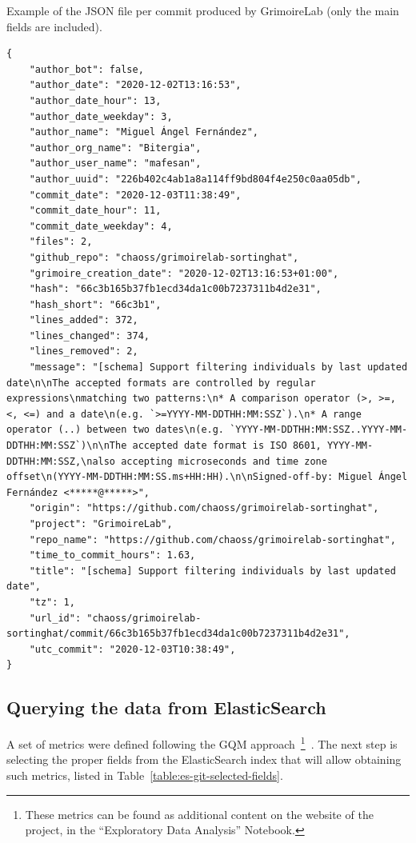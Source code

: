 \documentclass[a4paper, 12pt]{book}
\begin{document}
\begin{listing}[h!]
    \caption{Example of the JSON file per commit produced by GrimoireLab (only the main fields are included).}{}
    \label{lst:git-elasticsearch}
    \begin{verbatim}
{
    "author_bot": false,
    "author_date": "2020-12-02T13:16:53",
    "author_date_hour": 13,
    "author_date_weekday": 3,
    "author_name": "Miguel Ángel Fernández",
    "author_org_name": "Bitergia",
    "author_user_name": "mafesan",
    "author_uuid": "226b402c4ab1a8a114ff9bd804f4e250c0aa05db",
    "commit_date": "2020-12-03T11:38:49",
    "commit_date_hour": 11,
    "commit_date_weekday": 4,
    "files": 2,
    "github_repo": "chaoss/grimoirelab-sortinghat",
    "grimoire_creation_date": "2020-12-02T13:16:53+01:00",
    "hash": "66c3b165b37fb1ecd34da1c00b7237311b4d2e31",
    "hash_short": "66c3b1",
    "lines_added": 372,
    "lines_changed": 374,
    "lines_removed": 2,
    "message": "[schema] Support filtering individuals by last updated date\n\nThe accepted formats are controlled by regular expressions\nmatching two patterns:\n* A comparison operator (>, >=, <, <=) and a date\n(e.g. `>=YYYY-MM-DDTHH:MM:SSZ`).\n* A range operator (..) between two dates\n(e.g. `YYYY-MM-DDTHH:MM:SSZ..YYYY-MM-DDTHH:MM:SSZ`)\n\nThe accepted date format is ISO 8601, YYYY-MM-DDTHH:MM:SSZ,\nalso accepting microseconds and time zone offset\n(YYYY-MM-DDTHH:MM:SS.ms+HH:HH).\n\nSigned-off-by: Miguel Ángel Fernández <*****@*****>",
    "origin": "https://github.com/chaoss/grimoirelab-sortinghat",
    "project": "GrimoireLab",
    "repo_name": "https://github.com/chaoss/grimoirelab-sortinghat",
    "time_to_commit_hours": 1.63,
    "title": "[schema] Support filtering individuals by last updated date",
    "tz": 1,
    "url_id": "chaoss/grimoirelab-sortinghat/commit/66c3b165b37fb1ecd34da1c00b7237311b4d2e31",
    "utc_commit": "2020-12-03T10:38:49",
}
    \end{verbatim}
\end{listing}

\subsection{Querying the data from ElasticSearch}
\label{ssec:querying-es}

A set of metrics were defined following the GQM approach~\footnote{These metrics can be found as additional content on the website of the project, in the ``Exploratory Data Analysis'' Notebook.}~\cite{Basili94-gqm}. The next step is selecting the proper fields from the ElasticSearch index that will allow obtaining such metrics, listed in Table~\ref{table:es-git-selected-fields}.
\end{document}
